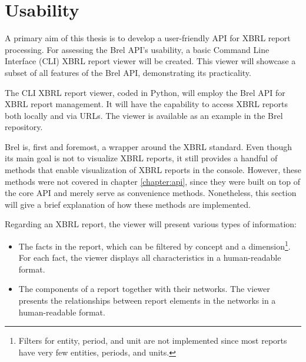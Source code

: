 \section{Usability}
\label{sec:usability}



A primary aim of this thesis is to develop a user-friendly API for XBRL report processing.  
For assessing the Brel API's usability, a basic Command Line Interface (CLI) XBRL report viewer will be created.  
This viewer will showcase a subset of all features of the Brel API, demonstrating its practicality.

The CLI XBRL report viewer, coded in Python, will employ the Brel API for XBRL report management.  
It will have the capability to access XBRL reports both locally and via URLs.
The viewer is available as an example in the Brel repository\cite{brel_source}.

Brel is, first and foremost, a wrapper around the XBRL standard.
Even though its main goal is not to visualize XBRL reports, 
it still provides a handful of methods that enable visualization of XBRL reports in the console.
However, these methods were not covered in chapter \ref{chapter:api}, 
since they were built on top of the core API and merely serve as convenience methods.
Nonetheless, this section will give a brief explanation of how these methods are implemented.
\pagebreak

Regarding an XBRL report, the viewer will present various types of information:

\begin{itemize}
    \item The facts in the report, which can be filtered by concept and a dimension\footnote{Filters for entity, period, and unit are not implemented since most reports have very few entities, periods, and units.}.
    For each fact, the viewer displays all characteristics in a human-readable format.
    \item The components of a report together with their networks.
    The viewer presents the relationships between report elements in the networks in a human-readable format.
\end{itemize}

